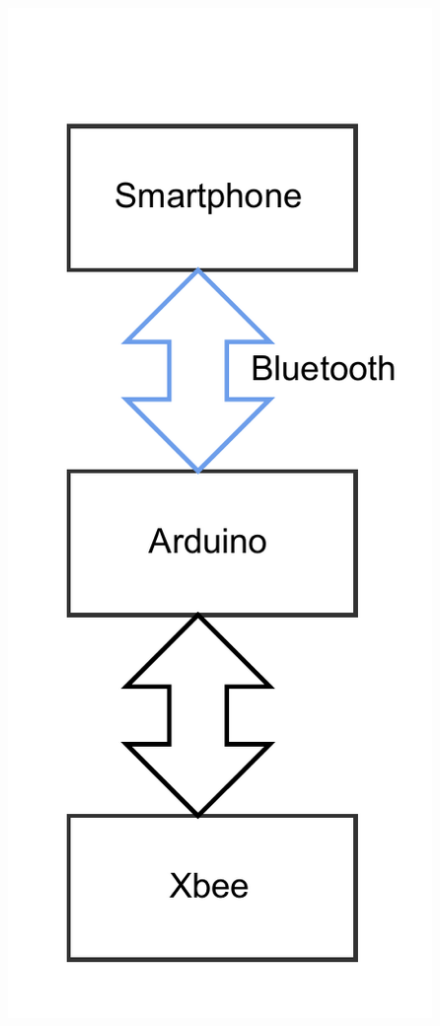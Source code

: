 \begin{figure}[htbp]
	\centering
	\begin{minipage}{.5\textwidth}
		\centering
		\includegraphics[scale=0.33]{metodologia/figuras/arquiteturaPrototipoVeiculo.pdf}

\end{minipage}
\end{figure}

